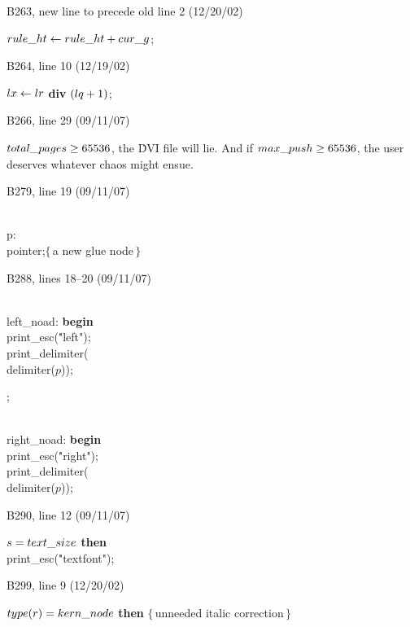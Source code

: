{{\bugonpage B263, new line to precede old line 2 (12/20/02)

\ninepoint\noindent
\quad$\\{rule\_ht}\gets\\{rule\_ht}+\\{cur\_g}$;

\bugonpage B264, line 10 (12/19/02)

\ninepoint\noindent
{} $\\{lx}\gets\\{lr}$ {\bf div} $(\\{lq}+1)$;

\bugonpage B266, line 29 (09/11/07)

\tenpoint\noindent
$\\{total\_pages}\ge65536$, the \.{DVI} file will lie. And if
$\\{max\_push}\ge65536$, the user deserves whatever chaos might ensue.

\bugonpage B279, line 19 (09/11/07)

\ninepoint\noindent
\qquad\\{p}: \\{pointer};\quad$\{\,$a new glue node$\,\}$

\bugonpage B288, lines 18--20 (09/11/07)

\ninepoint\noindent
\\{left\_noad}: {\bf begin} \\{print\_esc}(\.{"left"});
  \\{print\_delimiter}(\\{delimiter}($p$));\par\noindent
{};\par\noindent
\\{right\_noad}: {\bf begin} \\{print\_esc}(\.{"right"});
  \\{print\_delimiter}(\\{delimiter}($p$));

\bugonpage B290, line 12 (09/11/07)

\ninepoint\noindent
{} $s=\\{text\_size}$ {\bf then}
 \\{print\_esc}(\.{"textfont"});

\bugonpage B299, line 9 (12/20/02)

\ninepoint\noindent
\qquad\qquad{} $\\{type}(r)=\\{kern\_node}$ {\bf then}
 \quad$\{\,$unneeded italic correction$\,\}$

}}
